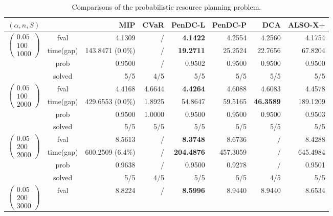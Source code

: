 \documentclass[11pt]{article}
\begin{document}
\begin{table}[ht!]
\centering
\caption{Comparisons of the probabilistic resource planning problem.}
\label{tab:resource-avg}
\scriptsize
\setlength{\tabcolsep}{3pt}
\renewcommand{\arraystretch}{0.92}
\begin{tabular}{ccrrrrrr}
\toprule
$(\alpha,n,S)$ & & MIP & CVaR & PenDC-L & PenDC-P & DCA & ALSO-X+\\
\midrule
\multirow{4}{*}{$\left(\begin{array}{c} 0.05 \\ 100 \\ 1000 \end{array}\right)$} & fval  & 4.1309 & / & \textbf{4.1422} & 4.2554 & 4.2560 & 4.1754\\
& time(gap)  & 143.8471 (0.0\%)  & / & \textbf{19.2711} & 25.2524 & 22.7656 & 67.8204\\
& prob  & 0.9500 & / & 0.9502 & 0.9500 & 0.9500 & 0.9500\\
& solved & 5/5 & 4/5 & 5/5 & 5/5 & 5/5 & 5/5\\
\midrule
\multirow{4}{*}{$\left(\begin{array}{c} 0.05 \\ 100 \\ 2000 \end{array}\right)$} & fval  & 4.4168 & 4.6644 & \textbf{4.4264} & 4.6088 & 4.6083 & 4.4578\\
& time(gap)  & 429.6553 (0.0\%) & 1.8925 & 54.8647 & 59.5165 & \textbf{46.3589} & 189.1209\\
& prob  & 0.9500 & 1.0000 & 0.9500 & 0.9500 & 0.9500 & 0.9503\\
& solved & 5/5 & 5/5 & 5/5 & 5/5 & 5/5 & 5/5\\
\midrule
\multirow{4}{*}{$\left(\begin{array}{c} 0.05 \\ 200 \\ 2000 \end{array}\right)$} & fval  & 8.5613 & / & \textbf{8.3748} & 8.6736 & / & 8.4288\\
& time(gap)  & 600.2509 (6.4\%) & / & \textbf{204.4876} & 457.3059 & / & 645.4984\\
& prob  & 0.9638 & / & 0.9500 & 0.9278 & / & 0.9501\\
& solved & 5/5 & 4/5 & 5/5 & 5/5 & 4/5 & 5/5\\
\midrule
\multirow{4}{*}{$\left(\begin{array}{c} 0.05 \\ 200 \\ 3000 \end{array}\right)$} & fval  & 8.8224 & / & \textbf{8.5996} & 8.9440 & 8.9440 & 8.6534\\

\end{tabular}
\end{table}
\end{document}

